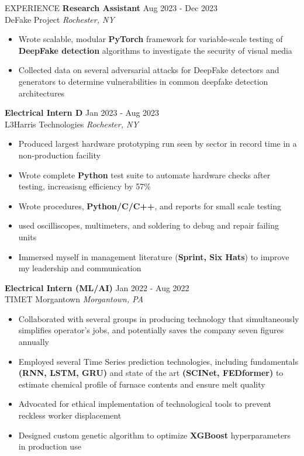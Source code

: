 \documentclass{resume} %
\begin{document}
\begin{rSection}{EXPERIENCE}
\textbf{Research Assistant} \hfill Aug 2023 - Dec 2023\\
DeFake Project \hfill \textit{Rochester, NY}
\begin{itemize}
\itemsep-3pt {}
    \item Wrote scalable, modular \textbf{PyTorch} framework for variable-scale testing of \textbf{DeepFake detection} algorithms to investigate the security of visual media
    \item Collected data on several adversarial attacks for DeepFake detectors and generators to determine vulnerabilities in common deepfake detection architectures
\end{itemize}

\textbf{Electrical Intern D} \hfill Jan 2023 - Aug 2023\\
L3Harris Technologies \hfill \textit{Rochester, NY}
\begin{itemize}
\itemsep-3pt {}
    \item Produced largest hardware prototyping run seen by sector in record time in a non-production facility
    \item Wrote complete \textbf{Python} test suite to automate hardware checks after testing, increasisng efficiency by 57\%
    \item Wrote procedures, \textbf{Python/C/C++}, and reports for small scale testing
    \item used oscilliscopes, multimeters, and soldering to debug and repair failing units
    \item Immersed myself in management literature (\textbf{Sprint, Six Hats}) to improve my leadership and communication
\end{itemize}

    \textbf{Electrical Intern (ML/AI)} \hfill Jan 2022 - Aug 2022\\
TIMET Morgantown \hfill \textit{Morgantown, PA}
 \begin{itemize}
    \itemsep-3pt {}
     \item Collaborated with several groups in producing technology that simultaneously simplifies operator’s jobs, and potentially saves the company seven figures annually
     \item Employed several Time Series prediction technologies, including fundamentals \textbf{(RNN, LSTM, GRU)} and state of the art \textbf{(SCINet, FEDformer)} to estimate chemical profile of furnace contents and ensure melt quality
     \item Advocated for ethical implementation of technological tools to prevent reckless worker displacement
     \item Designed custom genetic algorithm to optimize \textbf{XGBoost} hyperparameters in production use
 \end{itemize}

\end{rSection} 
\end{document}
